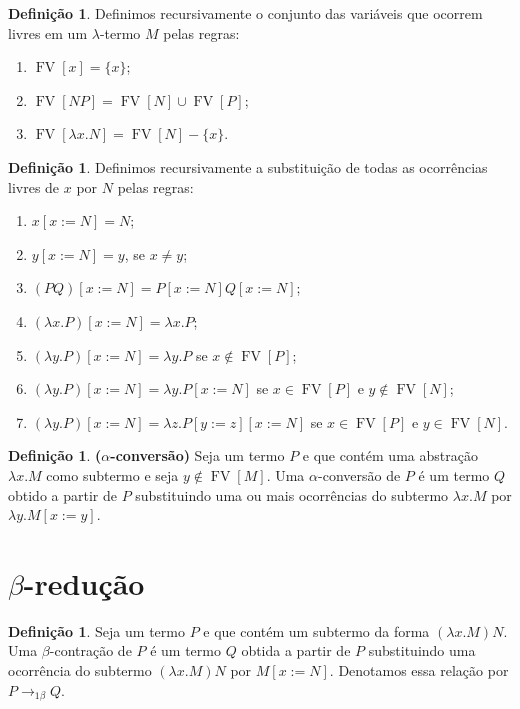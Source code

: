 \documentclass[12pt]{article}
\theoremstyle{definition}
\newtheorem{definition}[theorem]{Definição}
\DeclareMathOperator{\FV}{\mathrm{FV}}
\begin{document}
\begin{definition}
  Definimos recursivamente o conjunto das variáveis que ocorrem livres em um $\lambda$-termo $M$ pelas regras:
  \begin{enumerate}
  \item $\FV[x] = \{x\}$;
  \item $\FV[NP] = \FV[N] \cup \FV[P]$;
  \item $\FV[\lambda x.N] = \FV[N] - \{x\}$.
  \end{enumerate}
\end{definition}
\vspace{1cm}

\begin{definition}
  Definimos recursivamente a substituição de todas as ocorrências livres de $x$ por $N$ pelas regras:
  \begin{enumerate}
  \item $x[x := N] = N$;
  \item $y[x := N] = y$, se $x \neq y$;
  \item $(PQ)[x := N] = P[x := N] Q[x := N]$;
  \item $(\lambda x.P)[x := N] = \lambda x.P$;
  \item $(\lambda y.P)[x := N] = \lambda y.P$ se $x \not\in \FV[P]$;
  \item $(\lambda y.P)[x := N] = \lambda y.P[x := N]$ se $x \in \FV[P]$ e $y \not\in \FV[N]$;
  \item $(\lambda y.P)[x := N] = \lambda z.P[y := z][x := N]$ se $x \in \FV[P]$ e $y \in \FV[N]$.  
  \end{enumerate}
\end{definition}
\vspace{1cm}

\begin{definition} \textbf{($\alpha$-conversão)}
  Seja um termo $P$ e que contém uma abstração $\lambda x.M$ como subtermo e seja $y \not\in \FV[M]$. Uma $\alpha$-conversão de $P$ é um termo $Q$ obtido a partir de $P$ substituindo uma ou mais ocorrências do subtermo $\lambda x.M$ por $\lambda y.M[x := y]$. 
\end{definition}

\section{$\beta$-redução}
\begin{definition}
  Seja um termo $P$ e que contém um subtermo da forma $(\lambda x.M)N$. Uma $\beta$-contração de $P$ é um termo $Q$ obtida a partir de $P$ substituindo uma ocorrência do subtermo $(\lambda x.M)N$ por $M[x := N]$. Denotamos essa relação por $P \to_{1 \beta}Q$.
\end{definition}
\vspace{1cm}
\end{document}
